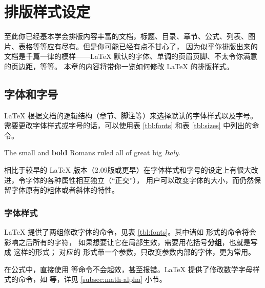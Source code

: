 \chapter{排版样式设定}\label{chap:styles}

\begin{intro}
至此你已经基本学会排版内容丰富的文档，标题、目录、章节、公式、列表、图片、表格等等应有尽有。但是你可能已经有点不甘心了，
因为似乎你排版出来的文档是千篇一律的模样——\LaTeX{} 默认的字体、单调的页眉页脚、不太令你满意的页边距，等等。
本章的内容将带你一览如何修改 \LaTeX{} 的排版样式。
\end{intro}

\section{字体和字号}\label{sec:font}

\LaTeX{} 根据文档的逻辑结构（章节、脚注等）来选择默认的字体样式以及字号。
需要更改字体样式或字号的话，可以使用表 \ref{tbl:fonts} 和表 \ref{tbl:sizes} 中列出的命令。
\begin{example}
{\small The small and
\textbf{bold} Romans ruled}
{\Large all of great big
{\itshape Italy}.}
\end{example}

\LaTeXe{} 相比于较早的 \LaTeX{} 版本（2.09版或更早）在字体样式和字号的设定上有很大改进，令字体的各种属性相互独立（“正交”），
用户可以改变字体的大小，而仍然保留字体原有的粗体或者斜体的特性。

\subsection{字体样式}\label{subsec:fontshape}

\LaTeX{} 提供了两组修改字体的命令，见表 \ref{tbl:fonts}。其中诸如  形式的命令将会影响之后所有的字符，
如果想要让它在局部生效，需要用花括号\textbf{分组}，也就是写成  这样的形式；
对应的  形式带一个参数，只改变参数内部的字体，更为常用。

在公式中，直接使用  等命令不会起效，甚至报错。\LaTeX{} 提供了修改数学字母样式的命令，如  等，详见 \ref{subsec:math-alpha} 小节。

